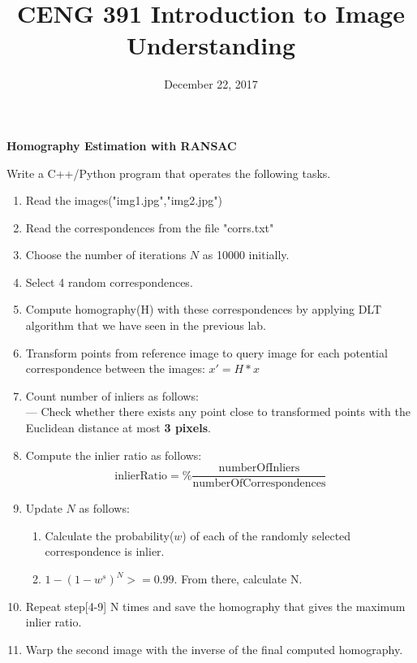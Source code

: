 \documentclass[12pt]{article}
\title{CENG 391 Introduction to Image Understanding}
\date{December 22, 2017}
\begin{document}
	\maketitle
	\begin{center}\textbf{Homography Estimation with RANSAC}\end{center}
Write a C++/Python program that  operates the following tasks.
\begin{enumerate}
\item Read the images("img1.jpg","img2.jpg")
\item Read the correspondences from the file "corrs.txt" 
\item Choose the number of iterations $N$ as 10000 initially.
\item Select 4 random correspondences.
\item Compute homography(H) with these correspondences by applying DLT algorithm that we have seen in the previous lab.
\item Transform points from reference image to query image for each potential correspondence between the images: $x' = H * x $
\item Count number of inliers as follows:\\
    --- Check whether there exists any point close to transformed points with the Euclidean distance at most \textbf{3 pixels}.
\item Compute the inlier ratio as follows:\\
\begin{equation}
\text{inlierRatio} = \% \frac{\text{numberOfInliers}}{\text{numberOfCorrespondences}}
\end{equation}
\item Update $N$ as follows:\\
\begin{enumerate}

\item Calculate the probability($w$) of each of the randomly selected correspondence is inlier.
\item $1 - ( 1 - w^{s})^{N} >= 0.99$. From there, calculate N. 

\end{enumerate}
\item Repeat step[4-9] N times and save the homography that gives the maximum inlier ratio.

\item Warp the second image with the inverse of the final computed homography.
\end{enumerate}
\end{document}
